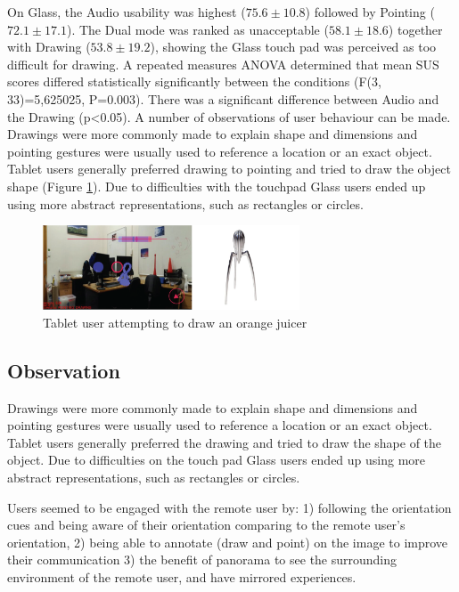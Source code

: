 On Glass, the Audio usability was highest ($75.6\pm10.8$) followed by Pointing ($72.1\pm17.1$). The Dual mode was ranked as unacceptable ($58.1\pm18.6$) together with Drawing ($53.8\pm19.2$), showing the Glass touch pad was perceived as too difficult for drawing. A repeated measures ANOVA determined that mean SUS scores differed statistically significantly between the conditions (F(3, 33)=5,625025, P=0.003). There was a significant difference between Audio and the Drawing (p<0.05). A number of observations of user behaviour can be made. Drawings were more commonly made to explain shape and dimensions and pointing gestures were usually used to reference a location or an exact object. Tablet users generally preferred drawing to pointing and tried to draw the object shape (Figure \ref{fig:ismar14:tablet-drawing}). Due to difficulties with the touchpad Glass users ended up using more abstract representations, such as rectangles or circles.

\begin{figure}[ht]
	\centering
	\includegraphics[width=3in]{images/ismar14/tablet-drawing}
	\caption{Tablet user attempting to draw an orange juicer}
	\label{fig:ismar14:tablet-drawing}
\end{figure}

\subsection{Observation}

Drawings were more commonly made to explain shape and dimensions and pointing gestures were usually used to reference a location or an exact object. Tablet users generally preferred the drawing and tried to draw the shape of the object. Due to difficulties on the touch pad Glass users ended up using more abstract representations, such as rectangles or circles.

Users seemed to be engaged with the remote user by: 1) following the orientation cues and being aware of their orientation comparing to the remote user's orientation, 2) being able to annotate (draw and point) on the image to improve their communication 3) the benefit of panorama to see the surrounding environment of the remote user, and have mirrored experiences.

